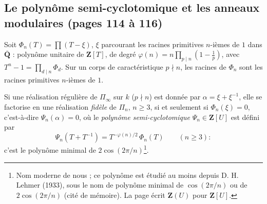 \documentclass[11pt,a4paper]{article}
\begin{document}
\subsection*{Le polynôme semi-cyclotomique et les anneaux modulaires (pages 114 à 116)}

Soit $\Phi_n(T) = \prod (T - \xi)$, $\xi$ parcourant les racines primitives
$n$-ièmes de $1$ dans $\bar{\mathbf{Q}}$ : polynôme unitaire de
$\mathbf{Z}[T]$, de degré $\varphi(n) = n \prod_{p \mid n}(1 - \frac1p)$, avec
$T^n - 1 = \prod_{d \mid n} \Phi_d$. Sur un corps de caractéristique $p \nmid
n$, les racines de $\Phi_n$ sont les racines primitives $n$-ièmes de $1$.

Si une réalisation régulière de $\Pi_\infty$ sur $k$ ($p \nmid n$) est donnée
par $\alpha = \xi + \xi^{-1}$, elle se factorise en une réalisation
\emph{fidèle} de $\Pi_n$, $n \geq 3$, si et seulement si $\Phi_n(\xi) = 0$,
c'est-à-dire $\Psi_n(\alpha) = 0$, où le \emph{polynôme semi-cyclotomique}
$\Psi_n \in \mathbf{Z}[U]$ est défini par
\[
  \Psi_n(T + T^{-1}) = T^{-\varphi(n)/2}\, \Phi_n(T) \qquad (n \geq 3) :
\]
c'est le polynôme minimal de $2\cos(2\pi/n)$\footnote{Nom moderne de nous ;
ce polynôme est étudié au moins depuis D. H. Lehmer (1933), sous le nom de
polynôme minimal de $\cos(2\pi/n)$ ou de $2\cos(2\pi/n)$ (cité de mémoire).
La page écrit $\mathbf{Z}(U)$ pour $\mathbf{Z}[U]$.}.
\end{document}

